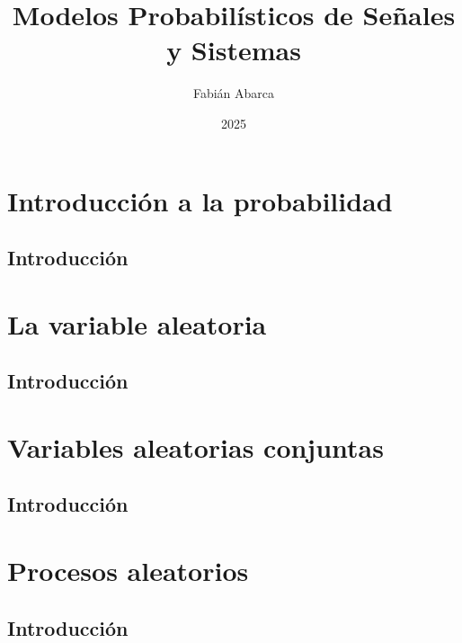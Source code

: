 \documentclass{memoir}
\title{Modelos Probabilísticos de Señales y Sistemas}
\author{Fabián Abarca}
\date{2025}
\begin{document}
\maketitle
\newpage
\tableofcontents

\part{Introducción a la probabilidad}

\chapter*{Introducción}





\part{La variable aleatoria}

\chapter*{Introducción}

\part{Variables aleatorias conjuntas}

\chapter*{Introducción}

\part{Procesos aleatorios}

\chapter*{Introducción}
\end{document}
